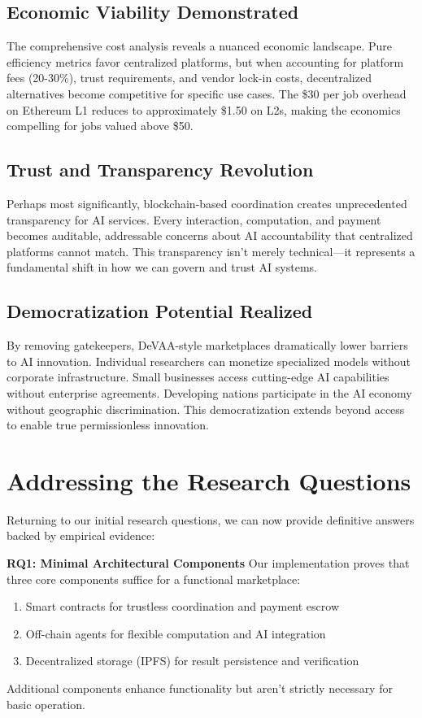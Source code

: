\subsection{Economic Viability Demonstrated}
The comprehensive cost analysis reveals a nuanced economic landscape. Pure efficiency metrics favor centralized platforms, but when accounting for platform fees (20-30\%), trust requirements, and vendor lock-in costs, decentralized alternatives become competitive for specific use cases. The \$30 per job overhead on Ethereum L1 reduces to approximately \$1.50 on L2s, making the economics compelling for jobs valued above \$50.

\subsection{Trust and Transparency Revolution}
Perhaps most significantly, blockchain-based coordination creates unprecedented transparency for AI services. Every interaction, computation, and payment becomes auditable, addressable concerns about AI accountability that centralized platforms cannot match. This transparency isn't merely technical—it represents a fundamental shift in how we can govern and trust AI systems.

\subsection{Democratization Potential Realized}
By removing gatekeepers, DeVAA-style marketplaces dramatically lower barriers to AI innovation. Individual researchers can monetize specialized models without corporate infrastructure. Small businesses access cutting-edge AI capabilities without enterprise agreements. Developing nations participate in the AI economy without geographic discrimination. This democratization extends beyond access to enable true permissionless innovation.

\section{Addressing the Research Questions}

Returning to our initial research questions, we can now provide definitive answers backed by empirical evidence:

\textbf{RQ1: Minimal Architectural Components}
Our implementation proves that three core components suffice for a functional marketplace:
\begin{enumerate}
    \item Smart contracts for trustless coordination and payment escrow
    \item Off-chain agents for flexible computation and AI integration  
    \item Decentralized storage (IPFS) for result persistence and verification
\end{enumerate}
Additional components enhance functionality but aren't strictly necessary for basic operation.

